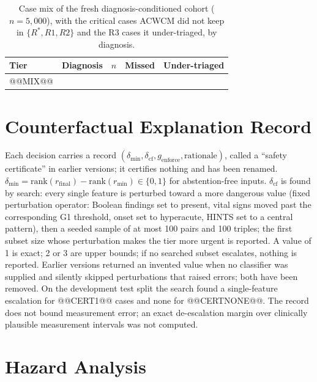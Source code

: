 \documentclass[11pt,a4paper]{article}%
\theoremstyle{plain}%
\theoremstyle{remark}%
\begin{document}
\begin{table}[h]
\caption{Case mix of the fresh diagnosis-conditioned cohort ($n=5{,}000$), with the critical cases ACWCM did not keep in $\{R^*,R1,R2\}$ and the R3 cases it under-triaged, by diagnosis.}\label{tab:mix}
\small
\begin{tabular}{@{}llrrr@{}}
\toprule
Tier & Diagnosis & $n$ & Missed & Under-triaged \\
\midrule
@@MIX@@
\bottomrule
\end{tabular}
\end{table}

\section{Counterfactual Explanation Record}\label{sup:cf}

Each decision carries a record $(\delta_{\min},\delta_{\text{cf}},g_{\text{enforce}},\text{rationale})$, called a ``safety certificate'' in earlier versions; it certifies nothing and has been renamed. $\delta_{\min}=\text{rank}(r_{\text{final}})-\text{rank}(r_{\min})\in\{0,1\}$ for abstention-free inputs. $\delta_{\text{cf}}$ is found by search: every single feature is perturbed toward a more dangerous value (fixed perturbation operator: Boolean findings set to present, vital signs moved past the corresponding G1 threshold, onset set to hyperacute, HINTS set to a central pattern), then a seeded sample of at most 100 pairs and 100 triples; the first subset size whose perturbation makes the tier more urgent is reported. A value of 1 is exact; 2 or 3 are upper bounds; if no searched subset escalates, nothing is reported. Earlier versions returned an invented value when no classifier was supplied and silently skipped perturbations that raised errors; both have been removed. On the development test split the search found a single-feature escalation for @@CERT1@@ cases and none for @@CERTNONE@@. The record does not bound measurement error; an exact de-escalation margin over clinically plausible measurement intervals was not computed.

\section{Hazard Analysis}\label{sup:hazard}
\end{document}
